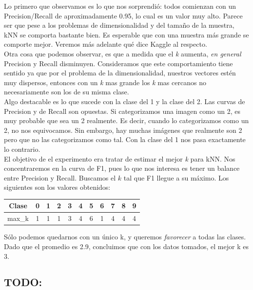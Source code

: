 Lo primero que observamos es lo que nos sorprendió: todos comienzan con un Precision/Recall de aproximadamente 0.95, lo cual es un valor muy alto. Parece ser que pese a los problemas de dimensionalidad y del tamaño de la muestra, kNN se comporta bastante bien. Es esperable que con una muestra más grande se comporte mejor. Veremos más adelante qué dice Kaggle al respecto.\\

Otra cosa que podemos observar, es que a medida que el \textit{k} aumenta, \textit{en general} Precision y Recall disminuyen. Consideramos que este comportamiento tiene sentido ya que por el problema de la dimensionalidad, nuestros vectores estén muy dispersos, entonces con un \textit{k} mas grande los \textit{k} mas cercanos no necesariamente son los de su misma clase. \\

Algo destacable es lo que sucede con la clase del 1 y la clase del 2. Las curvas de Precision y de Recall son opuestas. Si categorizamos una imagen como un 2, es muy probable que sea un 2 realmente. Es decir, cuando lo categorizamos como un 2, no nos equivocamos. Sin embargo, hay muchas imágenes que realmente son 2 pero que no las categorizamos como tal. Con la clase del 1 nos pasa exactamente lo contrario. \\

El objetivo de el experimento era tratar de estimar el mejor \textit{k} para kNN. Nos concentraremos en la curva de F1, pues lo que nos interesa es tener un balance entre Precision y Recall. Buscamos el $k$ tal que F1 llegue a su máximo. Los siguientes son los valores obtenidos: \\

\begin{center}
    \begin{tabular}{| c | c | c | c | c | c | c | c | c | c | c |}
    \hline
    Clase   & 0 & 1 & 2 & 3 & 4 & 5 & 6 & 7 & 8 & 9  \\ \hline
    max_k       & 1 & 1 & 1 & 3 & 4 & 6 & 1 & 4 & 4 & 4  \\ \hline
    \end{tabular}
\end{center}

Sólo podemos quedarnos con un único k, y queremos \textit{favorecer} a todas las clases. Dado que el promedio es 2.9, concluimos que con los datos tomados, el mejor k es 3. \\

\subsection{TODO:}

